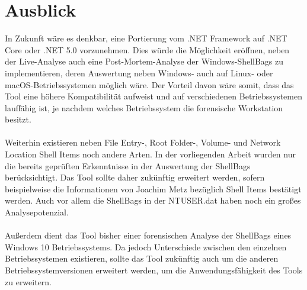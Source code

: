 \section{Ausblick}
\vspace{0.5cm}
In Zukunft wäre es denkbar, eine Portierung vom .NET Framework auf .NET Core oder .NET 5.0 vorzunehmen. Dies würde die Möglichkeit eröffnen, neben der Live-Analyse auch eine Post-Mortem-Analyse der Windows-ShellBags zu implementieren, deren Auswertung neben Windows- auch auf Linux- oder macOS-Betriebssystemen möglich wäre. Der Vorteil davon wäre somit, dass das Tool eine höhere Kompatibilität aufweist und auf verschiedenen Betriebssystemen lauffähig ist, je nachdem welches Betriebssystem die forensische Workstation besitzt. \cite{netcore,port} \\
\\
Weiterhin existieren neben File Entry-, Root Folder-, Volume- und Network Location Shell Items noch andere Arten. In der vorliegenden Arbeit wurden nur die bereits geprüften Erkenntnisse in der Auswertung der ShellBags berücksichtigt. Das Tool sollte daher zukünftig erweitert werden, sofern beispielweise die Informationen von Joachim Metz bezüglich Shell Items bestätigt werden. Auch vor allem die ShellBags in der NTUSER.dat haben noch ein großes Analysepotenzial. \cite{shelltype} \\
\\
Außerdem dient das Tool bisher einer forensischen Analyse der ShellBags eines Windows 10 Betriebssystems. Da jedoch Unterschiede zwischen den einzelnen Betriebssystemen existieren, sollte das Tool zukünftig auch um die anderen Betriebssystemversionen erweitert werden, um die Anwendungsfähigkeit des Tools zu erweitern. \cite{ba}


